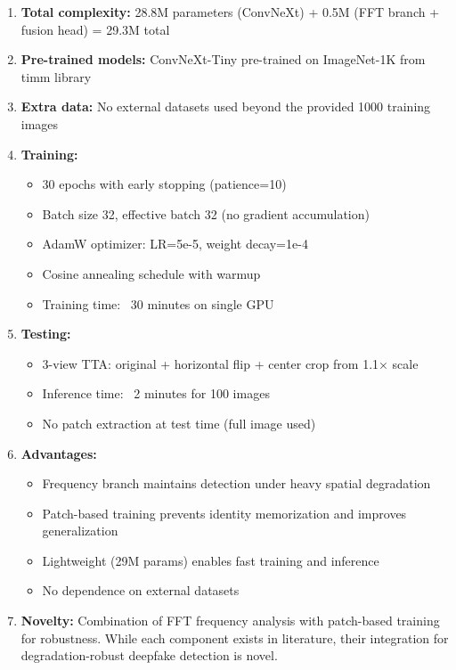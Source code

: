 \documentclass{article}
\begin{document}
\begin{enumerate}[label=\alph*)]
\item \textbf{Total complexity:} 28.8M parameters (ConvNeXt) + 0.5M (FFT branch + fusion head) = 29.3M total
\item \textbf{Pre-trained models:} ConvNeXt-Tiny pre-trained on ImageNet-1K from timm library
\item \textbf{Extra data:} No external datasets used beyond the provided 1000 training images
\item \textbf{Training:} 
\begin{itemize}
    \item 30 epochs with early stopping (patience=10)
    \item Batch size 32, effective batch 32 (no gradient accumulation)
    \item AdamW optimizer: LR=5e-5, weight decay=1e-4
    \item Cosine annealing schedule with warmup
    \item Training time: ~30 minutes on single GPU
\end{itemize}
\item \textbf{Testing:} 
\begin{itemize}
    \item 3-view TTA: original + horizontal flip + center crop from 1.1× scale
    \item Inference time: ~2 minutes for 100 images
    \item No patch extraction at test time (full image used)
\end{itemize}
\item \textbf{Advantages:}
\begin{itemize}
    \item Frequency branch maintains detection under heavy spatial degradation
    \item Patch-based training prevents identity memorization and improves generalization
    \item Lightweight (29M params) enables fast training and inference
    \item No dependence on external datasets
\end{itemize}
\item \textbf{Novelty:} Combination of FFT frequency analysis with patch-based training for robustness. While each component exists in literature, their integration for degradation-robust deepfake detection is novel.
\end{enumerate}
\end{document}
